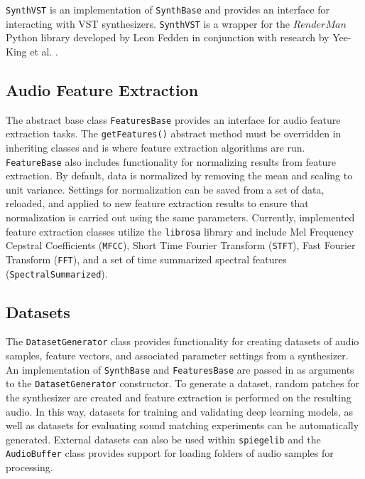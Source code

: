 %

\texttt{SynthVST} is an implementation of \texttt{SynthBase} and provides an interface for interacting with VST synthesizers. \texttt{SynthVST} is a wrapper for the $RenderMan$ Python library developed by Leon Fedden in conjunction with research by Yee-King et al. \cite{yee2018automatic}.

\subsection{Audio Feature Extraction}
The abstract base class \texttt{FeaturesBase} provides an interface for audio feature extraction tasks. 
The \texttt{getFeatures()} abstract method must be overridden in inheriting classes and is where feature extraction algorithms are run.  \texttt{FeatureBase} also includes functionality for normalizing results from feature extraction. By default, data is normalized by removing the mean and scaling to unit variance. Settings for normalization can be saved from a set of data, reloaded, and applied to new feature extraction results to ensure that normalization is carried out using the same parameters. Currently, implemented feature extraction classes utilize the \texttt{librosa} library \cite{mcfee2015librosa} and include Mel Frequency Cepstral Coefficients (\texttt{MFCC}), Short Time Fourier Transform (\texttt{STFT}), Fast Fourier Transform (\texttt{FFT}), and a set of time summarized spectral features (\texttt{SpectralSummarized}).

\subsection{Datasets}
The \texttt{DatasetGenerator} class provides functionality for creating datasets of audio samples, feature vectors, and associated parameter settings from a synthesizer. An implementation of \texttt{SynthBase} and \texttt{FeaturesBase} are passed in as arguments to the \texttt{DatasetGenerator} constructor. To generate a dataset, random patches for the synthesizer are created and feature extraction is performed on the resulting audio. In this way, datasets for training and validating deep learning models, as well as datasets for evaluating sound matching experiments can be automatically generated. 
External datasets can also be used within \texttt{spiegelib} and the \texttt{AudioBuffer} class provides support for loading folders of audio samples for processing.

